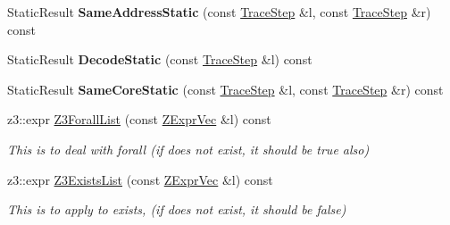 \begin{DoxyCompactItemize}
Static\+Result {\bfseries Same\+Address\+Static} (const \mbox{\hyperlink{classilang_1_1_trace_step}{Trace\+Step}} \&l, const \mbox{\hyperlink{classilang_1_1_trace_step}{Trace\+Step}} \&r) const
\item 
\mbox{\label{classilang_1_1_memory_model_ac7a404b012df4ac6524fccd0439a20cf}} 
Static\+Result {\bfseries Decode\+Static} (const \mbox{\hyperlink{classilang_1_1_trace_step}{Trace\+Step}} \&l) const
\item 
\mbox{\label{classilang_1_1_memory_model_a1e2d0d38ca0e8afd1464577707aa7e8a}} 
Static\+Result {\bfseries Same\+Core\+Static} (const \mbox{\hyperlink{classilang_1_1_trace_step}{Trace\+Step}} \&l, const \mbox{\hyperlink{classilang_1_1_trace_step}{Trace\+Step}} \&r) const
\item 
\mbox{\label{classilang_1_1_memory_model_ae9e0c2099c7a902f045baf2f704a26b6}} 
z3\+::expr \mbox{\hyperlink{classilang_1_1_memory_model_ae9e0c2099c7a902f045baf2f704a26b6}{Z3\+Forall\+List}} (const \mbox{\hyperlink{classilang_1_1_memory_model_ab0d3de967acef0330edf4d65d5782ce5}{Z\+Expr\+Vec}} \&l) const
\begin{DoxyCompactList}\small\item\em This is to deal with forall (if does not exist, it should be true also) \end{DoxyCompactList}\item 
\mbox{\label{classilang_1_1_memory_model_a66291b8bd976cdf495e3b0e16cf5400e}} 
z3\+::expr \mbox{\hyperlink{classilang_1_1_memory_model_a66291b8bd976cdf495e3b0e16cf5400e}{Z3\+Exists\+List}} (const \mbox{\hyperlink{classilang_1_1_memory_model_ab0d3de967acef0330edf4d65d5782ce5}{Z\+Expr\+Vec}} \&l) const
\begin{DoxyCompactList}\small\item\em This is to apply to exists, (if does not exist, it should be false) \end{DoxyCompactList}\end{DoxyCompactItemize}
